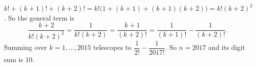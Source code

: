 $k!+(k+1)!+(k+2)!=k!\bigl(1+(k+1)+(k+1)(k+2)\bigr)=k!(k+2)^2$. So the general term is
\[\dfrac{k+2}{k!(k+2)^2}=\dfrac1{k!(k+2)}=\dfrac{k+1}{(k+2)!}=\dfrac1{(k+1)!}-\dfrac1{(k+2)!}.\]
Summing over $k=1,\dots,2015$ telescopes to $\dfrac1{2!}-\dfrac1{2017!}$. So $n=2017$ and its digit sum is $\boxed{10}$.
